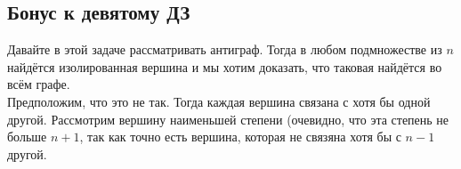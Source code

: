 \subsection{Бонус к девятому ДЗ}


Давайте в этой задаче рассматривать антиграф. Тогда в любом подмножестве из $n$ найдётся изолированная вершина и мы хотим доказать, что таковая найдётся во всём графе.\\
Предположим, что это не так. Тогда каждая вершина связана с хотя бы одной другой. Рассмотрим вершину наименьшей степени (очевидно, что эта степень не больше $n+1$, так как точно есть вершина, которая не связяна хотя бы с $n-1$ другой.
